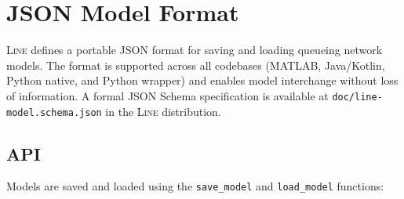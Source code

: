 \chapter{JSON Model Format}
\label{JSON-Model-Format}

\textsc{Line} defines a portable JSON format for saving and loading queueing network models. The format is supported across all codebases (MATLAB, Java/Kotlin, Python native, and Python wrapper) and enables model interchange without loss of information. A formal JSON Schema specification is available at \texttt{doc/line-model.schema.json} in the \textsc{Line} distribution.

\section{API}
\label{json:api}

Models are saved and loaded using the \texttt{save\_model} and \texttt{load\_model} functions:

